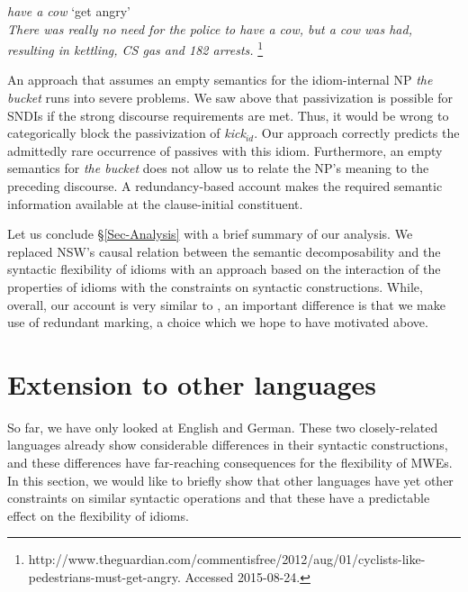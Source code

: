 \documentclass[output=paper]{langsci/langscibook}
\begin{document}
\begin{exe}
\ex \textit{have a cow} `get angry'\label{cow} \\ 
\textit{There was really no need for the police to have a cow, but \emph{a cow was had}, resulting in kettling, CS gas and 182 arrests.}%
\footnote{http://www.theguardian.com/commentisfree/2012/aug/01/cyclists-like-pedestrians-must-get-angry. Accessed 2015-08-24.}
\end{exe}

An approach that assumes an empty semantics for the idiom-internal NP \textit{the bucket} runs into severe problems. We saw above that passivization is possible for SNDIs 
if the strong discourse requirements are met. 
Thus, %
it would be wrong to categorically block the passivization of
\textit{kick$_{id}$}.
Our approach correctly predicts the admittedly rare occurrence of passives with this idiom.
%
Furthermore, an empty semantics for \textit{the bucket} does not allow us to relate the NP's meaning to the preceding discourse. A redundancy-based account makes the required semantic information available at the clause-initial constituent.

\newpage 
Let us conclude §\ref{Sec-Analysis} with a brief summary of our analysis. We replaced NSW's causal relation  between the semantic decomposability and the  syntactic flexibility of idioms with an approach based on  the interaction of the properties of idioms with the constraints on syntactic constructions. While, overall, our account is very similar to \cite{kaysagidioms}, an important difference is that we make use of redundant marking, a choice which we hope to have motivated above.


\section{Extension to other languages}
\label{Sec-OtherLanguages}

So far, we have only looked at 
English and German. These two closely-related languages already show considerable differences in their syntactic constructions, and these differences have far-reaching consequences for the flexibility of MWEs. In this section, we would like to briefly show that other languages have yet other constraints on similar syntactic operations and that these have a predictable effect on the flexibility of idioms.
\end{document}
